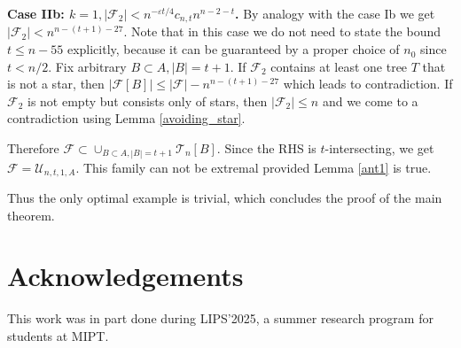 \documentclass[11pt,letterpaper]{amsart}
\newcommand{\eps}{\varepsilon}
\renewcommand{\le}{\leqslant}
\newcommand{\ff}{\mathcal{F}}
\newcommand{\uu}{\mathcal U}
\newcommand{\T}{\mathcal{T}}
\begin{document}
\textbf{Case IIb: $k = 1, |\ff_2| < {n^{-\eps t/4}}c_{n, t}n^{n-2-t}$.} By analogy with the case Ib we get $|\ff_2| < n^{n-(t + 1)-27}$.  Note that in this case we do not need to state the bound $t \le n - 55$ explicitly, because it can be guaranteed by a proper choice of $n_0$ since $t< n/2$. Fix arbitrary $B\subset A, |B| = t+1$. If $\ff_2$ contains at least one tree $T$ that is not a star, then $|\ff[B]| \leqslant |\ff| - n^{n - (t+1)-27}$ which leads to contradiction. If $\ff_2$ is not empty but consists only of stars, then $|\ff_2| \leqslant n$ and we come to a contradiction using Lemma \ref{avoiding_star}.

Therefore $\ff \subset  \cup_{B\subset A, |B| = t+1}\T_n[B]$. Since the RHS is $t$-intersecting, we get $\ff = \uu_{n, t, 1, A}$. This family can not be extremal provided Lemma \ref{ant1} is true. 

Thus the only optimal example is trivial, which concludes the proof of the main theorem.

\section{Acknowledgements} This work was in part done during LIPS'2025, a summer research program for students at MIPT.
\end{document}
